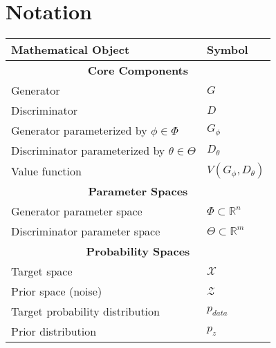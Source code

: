 \section{Notation}
\vspace{1cm}
\begin{center}
	\renewcommand{\arraystretch}{1.5}
	\begin{tabular}{@{}p{} p{}@{}}
		\toprule
		\textbf{Mathematical Object}                       & \textbf{Symbol}                                     \\
		\midrule
		\multicolumn{2}{c}{\textbf{Core Components}}                                                             \\
		Generator                                          & $G$                                                 \\
		Discriminator                                      & $D$                                                 \\
		Generator parameterized by $\phi \in \Phi$         & $G_\phi$                                            \\
		Discriminator parameterized by $\theta \in \Theta$ & $D_\theta$                                          \\
		Value function                                     & $V(G_\phi, D_\theta)$                               \\
		\midrule
		\multicolumn{2}{c}{\textbf{Parameter Spaces}}                                                            \\
		Generator parameter space                          & $\Phi \subset \mathbb{R}^n$                         \\
		Discriminator parameter space                      & $\Theta \subset \mathbb{R}^m$                       \\
		\midrule
		\multicolumn{2}{c}{\textbf{Probability Spaces}}                                                          \\
		Target space                                       & $\mathcal{X}$                                       \\
		Prior space (noise)                                & $\mathcal{Z}$                                       \\
		Target probability distribution                    & $p_{data}$                                          \\
		Prior distribution                                 & $p_z$                                               \\

\end{tabular}
\end{center}

